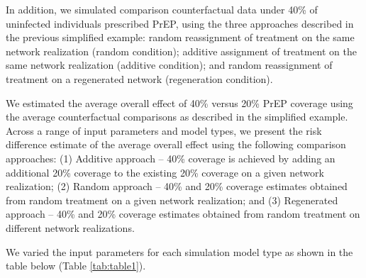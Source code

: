 \documentclass{article}
\theoremstyle{definition}
\begin{document}
In addition, we simulated comparison counterfactual data under 40\% of uninfected individuals prescribed PrEP, using the three approaches described in the previous simplified example: random reassignment of treatment on the same network realization (random condition); additive assignment of treatment on the same network realization (additive condition); and random reassignment of treatment on a regenerated network (regeneration condition). 

We estimated the average overall effect of 40\% versus 20\% PrEP coverage using the average counterfactual comparisons as described in the simplified example. Across a range of input parameters and model types, we present the risk difference estimate of the average overall effect using the following comparison approaches: (1) Additive approach -- 40\% coverage is achieved by adding an additional 20\% coverage to the existing 20\% coverage on a given network realization; (2) Random approach -- 40\% and 20\% coverage estimates obtained from random treatment on a given network realization; and (3) Regenerated approach -- 40\% and 20\% coverage estimates obtained from random treatment on different network realizations.

We varied the input parameters for each simulation model type as shown in the table below (Table \ref{tab:table1}).
\end{document}
